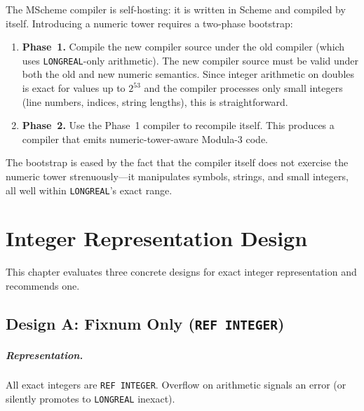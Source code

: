 \documentclass[12pt]{report}
\begin{document}
The MScheme compiler is self-hosting: it is written in Scheme and
compiled by itself.  Introducing a numeric tower requires a two-phase
bootstrap:

\begin{enumerate}
\item \textbf{Phase~1.}  Compile the new compiler source under the
  old compiler (which uses {\tt LONGREAL}-only arithmetic).  The new
  compiler source must be valid under both the old and new numeric
  semantics.  Since integer arithmetic on doubles is exact for values
  up to $2^{53}$ and the compiler processes only small integers
  (line numbers, indices, string lengths), this is straightforward.

\item \textbf{Phase~2.}  Use the Phase~1 compiler to recompile
  itself.  This produces a compiler that emits numeric-tower-aware
  Modula-3 code.
\end{enumerate}

The bootstrap is eased by the fact that the compiler itself does not
exercise the numeric tower strenuously---it manipulates symbols,
strings, and small integers, all well within {\tt LONGREAL}'s exact
range.

\chapter{Integer Representation Design}
\label{ch:integer-design}

This chapter evaluates three concrete designs for exact integer
representation and recommends one.

\section{Design A: Fixnum Only ({\tt REF INTEGER})}
\label{sec:fixnum-only}

\paragraph{Representation.}
All exact integers are {\tt REF INTEGER}.  Overflow on arithmetic
signals an error (or silently promotes to {\tt LONGREAL} inexact).
\end{document}
